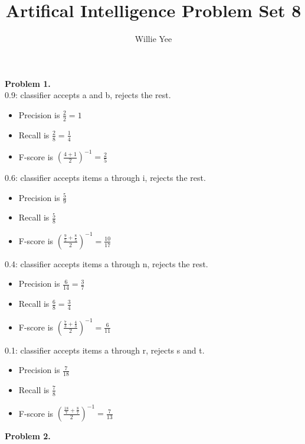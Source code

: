 \documentclass{article}
\begin{document}
\title{Artifical Intelligence Problem Set 8}
\date{}
\author{Willie Yee}
\maketitle
\noindent
\textbf{Problem 1.}\\
0.9: classifier accepts a and b, rejects the rest.
\begin{itemize}
	\item Precision is $\frac{2}{2}=1$
	\item Recall is $\frac{2}{8}=\frac{1}{4}$
	\item F-score is $(\frac{4 + 1}{2})^{-1}=\frac{2}{5}$
\end{itemize}
0.6: classifier accepts items a through i, rejects the rest.
\begin{itemize}
	\item Precision is $\frac{5}{9}$
	\item Recall is $\frac{5}{8}$
	\item F-score is $(\frac{\frac{9}{5}+\frac{8}{5}}{2})^{-1}=\frac{10}{17}$
\end{itemize}
0.4: classifier accepts items a through n, rejects the rest.
\begin{itemize}
	\item Precision is $\frac{6}{14}=\frac{3}{7}$
	\item Recall is $\frac{6}{8}=\frac{3}{4}$
	\item F-score is $(\frac{\frac{7}{3}+\frac{4}{3}}{2})^{-1}=\frac{6}{11}$
\end{itemize}
0.1: classifier accepts items a through r, rejects s and t.
\begin{itemize}
	\item Precision is $\frac{7}{18}$
	\item Recall is $\frac{7}{8}$
	\item F-score is $(\frac{\frac{18}{7}+\frac{8}{7}}{2})^{-1}=\frac{7}{13}$
\end{itemize}
\textbf{Problem 2.}
\end{document}
